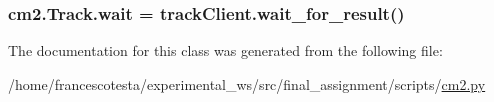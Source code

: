 \subsubsection[{\texorpdfstring{wait}{wait}}]{\setlength{\rightskip}{0pt plus 5cm}cm2.\+Track.\+wait = track\+Client.\+wait\+\_\+for\+\_\+result()\hspace{0.3cm}{\ttfamily [static]}}\hypertarget{classcm2_1_1Track_a06c6786fdec044086a2cfab42ee0feaa}{}\label{classcm2_1_1Track_a06c6786fdec044086a2cfab42ee0feaa}


The documentation for this class was generated from the following file\+:\begin{DoxyCompactItemize}
\item 
/home/francescotesta/experimental\+\_\+ws/src/final\+\_\+assignment/scripts/\hyperlink{cm2_8py}{cm2.\+py}\end{DoxyCompactItemize}
